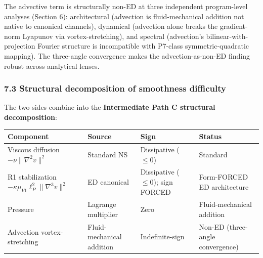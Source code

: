 \documentclass[
  11pt,a4paper]{article}
\newcounter{none} %
\begin{document}
The advective term is structurally non-ED at three independent
program-level analyses (Section 6): architectural (advection is
fluid-mechanical addition not native to canonical channels), dynamical
(advection alone breaks the gradient-norm Lyapunov via
vortex-stretching), and spectral (advection's bilinear-with-projection
Fourier structure is incompatible with P7-class symmetric-quadratic
mapping). The three-angle convergence makes the advection-as-non-ED
finding robust across analytical lenses.

\subsubsection{7.3 Structural decomposition of smoothness
difficulty}\label{structural-decomposition-of-smoothness-difficulty}

The two sides combine into the \textbf{Intermediate Path C structural
decomposition}:

{\def\LTcaptype{none} %
\begin{longtable}[]{@{}
  >{\raggedright\arraybackslash}p{}
  >{\raggedright\arraybackslash}p{}
  >{\raggedright\arraybackslash}p{}
  >{\raggedright\arraybackslash}p{}@{}}
\toprule\noalign{}
\begin{minipage}[b]{\linewidth}\raggedright
Component
\end{minipage} & \begin{minipage}[b]{\linewidth}\raggedright
Source
\end{minipage} & \begin{minipage}[b]{\linewidth}\raggedright
Sign
\end{minipage} & \begin{minipage}[b]{\linewidth}\raggedright
Status
\end{minipage} \\
\midrule\noalign{}
\endhead
\bottomrule\noalign{}
\endlastfoot
Viscous diffusion \(-\nu\|\nabla^2 v\|^2\) & Standard NS & Dissipative
(\(\le 0\)) & Standard \\
R1 stabilization \(-\kappa\mu_{V1}\ell_P^2\|\nabla^3 v\|^2\) & ED
canonical & Dissipative (\(\le 0\)); sign FORCED & Form-FORCED ED
architecture \\
Pressure & Lagrange multiplier & Zero & Fluid-mechanical addition \\
Advection vortex-stretching & Fluid-mechanical addition &
Indefinite-sign & Non-ED (three-angle convergence) \\
\end{longtable}
}
\end{document}
